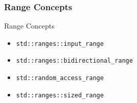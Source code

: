 \subsubsection{Range Concepts}

\begin{frame}[fragile]{Range Concepts}
    \begin{itemize}
        \item<1-> \texttt{std::ranges::input_range}
        \item<3-> \texttt{std::ranges::bidirectional_range}
        \item<5-> \texttt{std::random_access_range}
        \item<7-> \texttt{std::ranges::sized_range}
    \end{itemize}
\end{frame}


